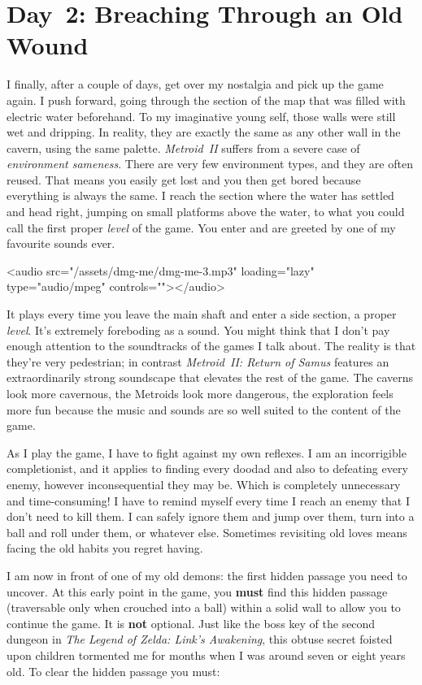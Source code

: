\documentclass{book}
\begin{document}
\FloatBarrier\needspace{5pt}\section*{Day 2: Breaching Through an Old Wound}\nopagebreak[4]

I finally, after a couple of days, get over my nostalgia and pick up the game again. I push forward, going through the section of the map that was filled with electric water beforehand. To my imaginative young self, those walls were still wet and dripping. In reality, they are exactly the same as any other wall in the cavern, using the same palette. \emph{Metroid II} suffers from a severe case of \emph{environment sameness}. There are very few environment types, and they are often reused. That means you easily get lost and you then get bored because everything is always the same. I reach the section where the water has settled and head right, jumping on small platforms above the water, to what you could call the first proper \emph{level} of the game. You enter and are greeted by one of my favourite sounds ever.

<audio src="/assets/dmg-me/dmg-me-3.mp3" loading="lazy" type="audio/mpeg" controls=""></audio>

It plays every time you leave the main shaft and enter a side section, a proper \emph{level}. It’s extremely foreboding as a sound. You might think that I don’t pay enough attention to the soundtracks of the games I talk about. The reality is that they’re very pedestrian; in contrast \emph{Metroid II: Return of Samus} features an extraordinarily strong soundscape that elevates the rest of the game. The caverns look more cavernous, the Metroids look more dangerous, the exploration feels more fun because the music and sounds are so well suited to the content of the game.

As I play the game, I have to fight against my own reflexes. I am an incorrigible completionist, and it applies to finding every doodad and also to defeating every enemy, however inconsequential they may be. Which is completely unnecessary and time-consuming! I have to remind myself every time I reach an enemy that I don’t need to kill them. I can safely ignore them and jump over them, turn into a ball and roll under them, or whatever else. Sometimes revisiting old loves means facing the old habits you regret having.

I am now in front of one of my old demons: the first hidden passage you need to uncover. At this early point in the game, you \textbf{must} find this hidden passage (traversable only when crouched into a ball) within a solid wall to allow you to continue the game. It is \textbf{not} optional. Just like the boss key of the second dungeon in \emph{The Legend of Zelda: Link’s Awakening}, this obtuse secret foisted upon children tormented me for months when I was around seven or eight years old. To clear the hidden passage you must:
\end{document}
